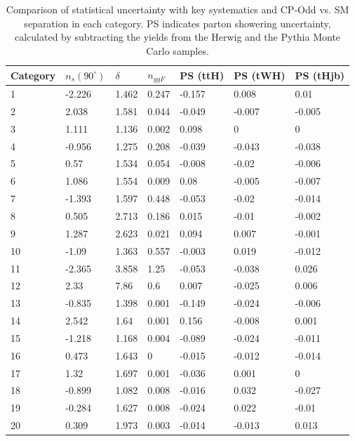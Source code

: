 \begin{table}[ht]
\begin{center}
\begin{tabular}{lllllll}
Category & $n_{s}(90^\circ)$ & $\delta$ & $n_{ggF}$ &PS (ttH)&PS (tWH)&PS (tHjb) \\ \hline 
1&-2.226&1.462&0.247&-0.157&0.008&0.01 \\ 
2&2.038&1.581&0.044&-0.049&-0.007&-0.005 \\ 
3&1.111&1.136&0.002&0.098&0&0 \\ 
4&-0.956&1.275&0.208&-0.039&-0.043&-0.038 \\ 
5&0.57&1.534&0.054&-0.008&-0.02&-0.006 \\ 
6&1.086&1.554&0.009&0.08&-0.005&-0.007 \\ 
7&-1.393&1.597&0.448&-0.053&-0.02&-0.014 \\
8&0.505&2.713&0.186&0.015&-0.01&-0.002 \\ 
9&1.287&2.623&0.021&0.094&0.007&-0.001 \\ 
10&-1.09&1.363&0.557&-0.003&0.019&-0.012 \\
11&-2.365&3.858&1.25&-0.053&-0.038&0.026 \\
12&2.33&7.86&0.6&0.007&-0.025&0.006 \\ \hline 
13&-0.835&1.398&0.001&-0.149&-0.024&-0.006 \\
14&2.542&1.64&0.001&0.156&-0.008&0.001 \\
15&-1.218&1.168&0.004&-0.089&-0.024&-0.011 \\
16&0.473&1.643&0&-0.015&-0.012&-0.014 \\
17&1.32&1.697&0.001&-0.036&0.001&0 \\
18&-0.899&1.082&0.008&-0.016&0.032&-0.027 \\
19&-0.284&1.627&0.008&-0.024&0.022&-0.01 \\ 
20&0.309&1.973&0.003&-0.014&-0.013&0.013 \\ \hline 
\hline
\end{tabular}
\end{center}
\vspace{-0.5cm}
\caption{Comparison of statistical uncertainty with key systematics and CP-Odd vs. SM separation in each category. PS indicates parton showering uncertainty, calculated by subtracting the yields from the Herwig and the Pythia Monte Carlo samples.}
\label{tab:systs}
\end{table}

